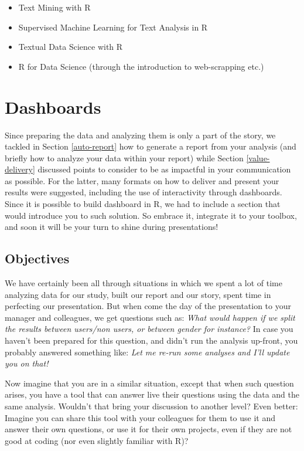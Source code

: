 \documentclass[
]{krantz}
\providecommand{\tightlist}{%
  \setlength{\itemsep}{0pt}\setlength{\parskip}{0pt}}
\renewenvironment{quote}{\begin{VF}}{\end{VF}}
\begin{document}
\begin{itemize}
\tightlist
\item
  Text Mining with R
\item
  Supervised Machine Learning for Text Analysis in R
\item
  Textual Data Science with R
\item
  R for Data Science (through the introduction to web-scrapping etc.)
\end{itemize}

\hypertarget{dashboards}{%
\chapter{Dashboards}\label{dashboards}}

\begin{quote}
Since preparing the data and analyzing them is only a part of the story, we tackled in Section \ref{auto-report} how to generate a report from your analysis (and briefly how to analyze your data within your report) while Section \ref{value-delivery} discussed points to consider to be as impactful in your communication as possible. For the latter, many formats on how to deliver and present your results were suggested, including the use of interactivity through dashboards. Since it is possible to build dashboard in R, we had to include a section that would introduce you to such solution. So embrace it, integrate it to your toolbox, and soon it will be your turn to shine during presentations!
\end{quote}

\hypertarget{objectives}{%
\section{Objectives}\label{objectives}}

We have certainly been all through situations in which we spent a lot of time analyzing data for our study, built our report and our story, spent time in perfecting our presentation. But when come the day of the presentation to your manager and colleagues, we get questions such as: \emph{What would happen if we split the results between users/non users, or between gender for instance?} In case you haven't been prepared for this question, and didn't run the analysis up-front, you probably answered something like: \emph{Let me re-run some analyses and I'll update you on that!}

Now imagine that you are in a similar situation, except that when such question arises, you have a tool that can answer live their questions using the data and the same analysis. Wouldn't that bring your discussion to another level?
Even better: Imagine you can share this tool with your colleagues for them to use it and answer their own questions, or use it for their own projects, even if they are not good at coding (nor even slightly familiar with R)?
\end{document}

